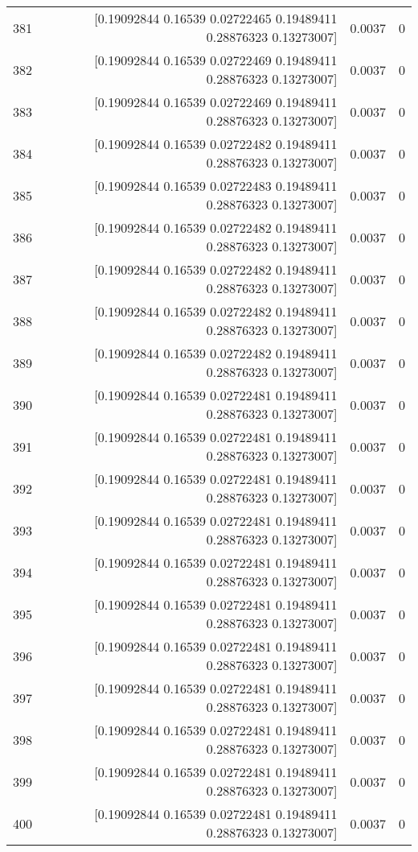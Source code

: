 \begin{longtable}{lrrr}
381 & [0.19092844 0.16539    0.02722465 0.19489411 0.28876323 0.13273007] & 0.0037 & 0 \\
382 & [0.19092844 0.16539    0.02722469 0.19489411 0.28876323 0.13273007] & 0.0037 & 0 \\
383 & [0.19092844 0.16539    0.02722469 0.19489411 0.28876323 0.13273007] & 0.0037 & 0 \\
384 & [0.19092844 0.16539    0.02722482 0.19489411 0.28876323 0.13273007] & 0.0037 & 0 \\
385 & [0.19092844 0.16539    0.02722483 0.19489411 0.28876323 0.13273007] & 0.0037 & 0 \\
386 & [0.19092844 0.16539    0.02722482 0.19489411 0.28876323 0.13273007] & 0.0037 & 0 \\
387 & [0.19092844 0.16539    0.02722482 0.19489411 0.28876323 0.13273007] & 0.0037 & 0 \\
388 & [0.19092844 0.16539    0.02722482 0.19489411 0.28876323 0.13273007] & 0.0037 & 0 \\
389 & [0.19092844 0.16539    0.02722482 0.19489411 0.28876323 0.13273007] & 0.0037 & 0 \\
390 & [0.19092844 0.16539    0.02722481 0.19489411 0.28876323 0.13273007] & 0.0037 & 0 \\
391 & [0.19092844 0.16539    0.02722481 0.19489411 0.28876323 0.13273007] & 0.0037 & 0 \\
392 & [0.19092844 0.16539    0.02722481 0.19489411 0.28876323 0.13273007] & 0.0037 & 0 \\
393 & [0.19092844 0.16539    0.02722481 0.19489411 0.28876323 0.13273007] & 0.0037 & 0 \\
394 & [0.19092844 0.16539    0.02722481 0.19489411 0.28876323 0.13273007] & 0.0037 & 0 \\
395 & [0.19092844 0.16539    0.02722481 0.19489411 0.28876323 0.13273007] & 0.0037 & 0 \\
396 & [0.19092844 0.16539    0.02722481 0.19489411 0.28876323 0.13273007] & 0.0037 & 0 \\
397 & [0.19092844 0.16539    0.02722481 0.19489411 0.28876323 0.13273007] & 0.0037 & 0 \\
398 & [0.19092844 0.16539    0.02722481 0.19489411 0.28876323 0.13273007] & 0.0037 & 0 \\
399 & [0.19092844 0.16539    0.02722481 0.19489411 0.28876323 0.13273007] & 0.0037 & 0 \\
400 & [0.19092844 0.16539    0.02722481 0.19489411 0.28876323 0.13273007] & 0.0037 & 0 \\

\end{longtable}
